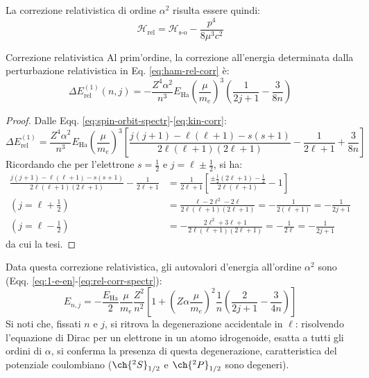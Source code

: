 La correzione relativistica di ordine $ \alpha^2 $ risulta essere quindi:
\begin{equation}
	\mathcal{H}_\text{rel} = \mathcal{H}_\text{s-o} - \frac{p^4}{8 \mu^3 c^2}
	\label{eq:ham-rel-corr}
\end{equation}

\begin{proposition}{Correzione relativistica}{}
	Al prim'ordine, la correzione all'energia determinata dalla perturbazione relativistica in Eq. \ref{eq:ham-rel-corr} è:
	\begin{equation}
		\Delta E_\text{rel}^{(1)}(n,j) = - \frac{Z^4 \alpha^2}{n^3} E_\text{Ha} \left( \frac{\mu}{m_e} \right)^3 \left( \frac{1}{2j + 1} - \frac{3}{8n} \right)
		\label{eq:rel-corr-spectr}
	\end{equation}

	\tcblower

	\begin{proof}
		Dalle Eqq. \ref{eq:spin-orbit-spectr}-\ref{eq:kin-corr}:
		\begin{equation*}
			\Delta E_\text{rel}^{(1)} = \frac{Z^4 \alpha^2}{n^3} E_\text{Ha} \left( \frac{\mu}{m_e} \right)^3 \left[ \frac{j(j+1) - \ell(\ell+1) - s(s+1)}{2\ell (\ell+1) (2\ell+1)} - \frac{1}{2\ell + 1} + \frac{3}{8n} \right]
		\end{equation*}
		Ricordando che per l'elettrone $ s = \frac{1}{2} $ e $ j = \ell \pm \frac{1}{2} $, si ha:
		\begin{equation*}
			\begin{split}
				\frac{j(j+1) - \ell(\ell+1) - s(s+1)}{2\ell (\ell+1) (2\ell+1)} - \frac{1}{2\ell + 1}
				&= \frac{1}{2\ell + 1} \left[ \frac{\pm \tfrac{1}{2} (2\ell + 1) - \tfrac{1}{2}}{2\ell (\ell + 1)} - 1 \right] \\
				(j = \ell + \tfrac{1}{2}) &= \frac{\ell - 2\ell^2 - 2\ell}{2\ell (\ell + 1) (2\ell + 1)} = - \frac{1}{2 (\ell + 1)} = - \frac{1}{2j + 1} \\
				(j = \ell - \tfrac{1}{2}) &= - \frac{2\ell^2 + 3\ell + 1}{2\ell (\ell + 1) (2\ell + 1)} = - \frac{1}{2\ell} = - \frac{1}{2j + 1}
			\end{split}
		\end{equation*}
		da cui la tesi.
	\end{proof}
\end{proposition}

Data questa correzione relativistica, gli autovalori d'energia all'ordine $ \alpha^2 $ sono (Eqq. \ref{eq:1-e-en}-\ref{eq:rel-corr-spectr}):
\begin{equation}
	E_{n,j} = - \frac{E_\text{Ha}}{2} \frac{\mu}{m_e} \frac{Z^2}{n^2} \left[ 1 + \left( Z \alpha \frac{\mu}{m_e} \right)^2 \frac{1}{n} \left( \frac{2}{2j + 1} - \frac{3}{4n} \right) \right]
\end{equation}
Si noti che, fissati $ n $ e $ j $, si ritrova la degenerazione accidentale in $ \ell $: risolvendo l'equazione di Dirac per un elettrone in un atomo idrogenoide, esatta a tutti gli ordini di $ \alpha $, si conferma la presenza di questa degenerazione, caratteristica del potenziale coulombiano ($ \ch{^2S}_{1/2} $ e $ \ch{^2P}_{1/2} $ sono degeneri).

